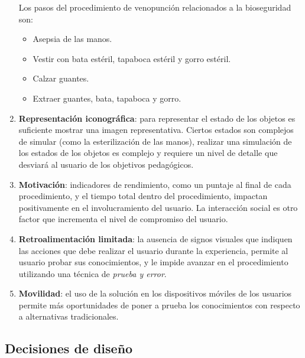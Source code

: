 \begin{enumerate}[label=\bfseries H\arabic*:]
    Los pasos del procedimiento de venopunción relacionados a la bioseguridad son:
    \begin{itemize}
        \item Asepsia de las manos.
        \item Vestir con bata estéril, tapaboca estéril y gorro estéril.
        \item Calzar guantes.
        \item Extraer guantes, bata, tapaboca y gorro.
    \end{itemize}
    
\item \textbf{Representación iconográfica}: para representar el estado de los
    objetos es suficiente mostrar una imagen representativa. Ciertos estados son
    complejos de simular (como la esterilización de las manos), realizar una
    simulación de los estados de los objetos es complejo y requiere un nivel de
    detalle que desviará al usuario de los objetivos pedagógicos.
    
\item \textbf{Motivación}: indicadores de rendimiento, como un puntaje al final
    de cada procedimiento, y el tiempo total dentro del procedimiento, impactan
    positivamente en el involucramiento del usuario. La interacción social es
    otro factor que incrementa el nivel de compromiso del usuario.

\item \textbf{Retroalimentación limitada}: la ausencia de signos visuales que
    indiquen las acciones que debe realizar el usuario durante la experiencia,
    permite al usuario probar sus conocimientos, y le impide avanzar en
    el procedimiento utilizando una técnica de \emph{prueba y error}.

\item \textbf{Movilidad}: el uso de la solución en los dispositivos móviles de
    los usuarios permite más oportunidades de poner a prueba los conocimientos
    con respecto a alternativas tradicionales.


\end{enumerate}

\subsection{Decisiones de diseño}

